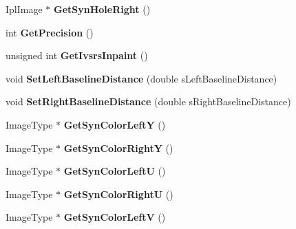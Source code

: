 \begin{DoxyCompactItemize}
Ipl\+Image $\ast$ {\bfseries Get\+Syn\+Hole\+Right} ()
\item 
\mbox{\label{class_c_view_interpolation_general_a2a7f127e413b4f204d2f27fbbfc9fa27}} 
int {\bfseries Get\+Precision} ()
\item 
\mbox{\label{class_c_view_interpolation_general_a98a1f644fb05edec90d2b83da708c9c7}} 
unsigned int {\bfseries Get\+Ivsrs\+Inpaint} ()
\item 
\mbox{\label{class_c_view_interpolation_general_ac76f4c66813f3a0eed6be4da1667f33f}} 
void {\bfseries Set\+Left\+Baseline\+Distance} (double s\+Left\+Baseline\+Distance)
\item 
\mbox{\label{class_c_view_interpolation_general_ac5bd7d33424bbda3d2f67134aad81325}} 
void {\bfseries Set\+Right\+Baseline\+Distance} (double s\+Right\+Baseline\+Distance)
\item 
\mbox{\label{class_c_view_interpolation_general_af78479a7abf4c138fcd33fc01c7adafe}} 
Image\+Type $\ast$ {\bfseries Get\+Syn\+Color\+LeftY} ()
\item 
\mbox{\label{class_c_view_interpolation_general_afba11ef873c298c52b944b64360b5fb9}} 
Image\+Type $\ast$ {\bfseries Get\+Syn\+Color\+RightY} ()
\item 
\mbox{\label{class_c_view_interpolation_general_aac450f8df7bb47c081d0f4bfc44be95d}} 
Image\+Type $\ast$ {\bfseries Get\+Syn\+Color\+LeftU} ()
\item 
\mbox{\label{class_c_view_interpolation_general_a122f2f4ce8d6544e157c313e3e3ce72c}} 
Image\+Type $\ast$ {\bfseries Get\+Syn\+Color\+RightU} ()
\item 
\mbox{\label{class_c_view_interpolation_general_ab3aa7855961c6a6f9703decd2128c2f7}} 
Image\+Type $\ast$ {\bfseries Get\+Syn\+Color\+LeftV} ()
\item 
\mbox{\label{class_c_view_interpolation_general_a1583036eb71012ecd8db62b757f4b334}} 

\end{DoxyCompactItemize}

